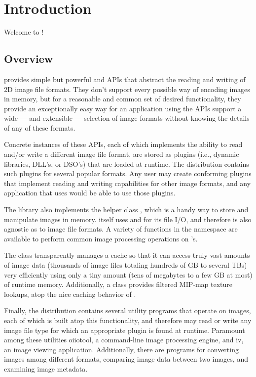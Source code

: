 \chapter{Introduction}
\label{chap:oiiointro}



Welcome to \product!

\bigskip

\section{Overview}

\product provides simple but powerful \ImageInput and \ImageOutput APIs
that abstract the reading and writing of 2D image file formats.  They
don't support every possible way of encoding images in memory, but for a
reasonable and common set of desired functionality, they provide an
exceptionally easy way for an application using the APIs support a wide
--- and extensible --- selection of image formats without knowing the
details of any of these formats.

Concrete instances of these APIs, each of which implements the ability
to read and/or write a different image file format, are stored as
plugins (i.e., dynamic libraries, DLL's, or DSO's) that are loaded at
runtime.  The \product distribution contains such plugins for several
popular formats.  Any user may create conforming plugins that implement
reading and writing capabilities for other image formats, and any
application that uses \product would be able to use those plugins.

The library also implements the helper class \ImageBuf, which is a handy way
to store and manipulate images in memory.  \ImageBuf itself uses \ImageInput
and \ImageOutput for its file I/O, and therefore is also agnostic as to
image file formats. A variety of functions in the \ImageBufAlgo namespace
are available to perform common image processing operations on \ImageBuf's.

The \ImageCache class transparently manages a cache so that it can
access truly vast amounts of image data (thousands of image files totaling
hundreds of GB to several TBs) very efficiently using only a tiny amount
(tens of megabytes to a few GB at most) of runtime memory.  Additionally, a
\TextureSystem class provides filtered MIP-map texture lookups, atop
the nice caching behavior of \ImageCache.

Finally, the \product distribution contains several utility programs that
operate on images, each of which is built atop this functionality, and
therefore may read or write any image file type for which an appropriate
plugin is found at runtime.  Paramount among these utilities {\cf oiiotool},
a command-line image processing engine, and {\fn iv}, an image viewing
application.  Additionally, there are programs for converting images among
different formats, comparing image data between two images, and examining
image metadata.

